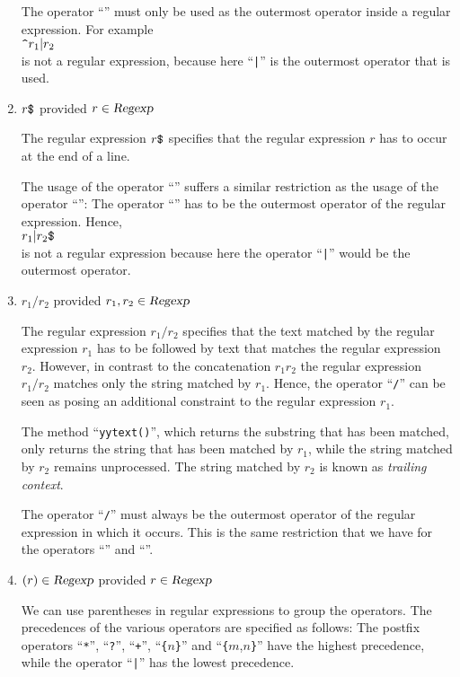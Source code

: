\begin{enumerate}
      The operator ``\texttt{}'' must only be used as the outermost operator inside a regular
      expression.  For example
      \\[0.2cm]
      \hspace*{1.3cm}
      $\texttt{\symbol{94}}r_1|r_2$
      \\[0.2cm]
      is not a regular expression, because here ``\texttt{|}'' is the outermost operator that is used.
\item $r\texttt{\symbol{36}}$ \quad provided $r \in \textsl{Regexp}$

      The regular expression $r\texttt{\symbol{36}}$ specifies that the regular expression $r$ has
      to occur at the end of a line.

      The usage of the operator  ``\texttt{}'' suffers a similar restriction as the usage
      of the operator ``\texttt{}'':  The operator ``\texttt{}'' has to be the
      outermost operator of the regular expression.  Hence,
      \\[0.2cm]
      \hspace*{1.3cm}
      $r_1|r_2\texttt{\symbol{36}}$
      \\[0.2cm]
      is not a regular expression because here the operator ``\texttt{|}'' would be the outermost
      operator.
\item $r_1\texttt{/}r_2$ \quad provided $r_1, r_2 \in \textsl{Regexp}$
  
      The regular expression $r_1\texttt{/}r_2$ specifies that the text matched by the regular
      expression  $r_1$ has to be followed by text that matches the regular expression $r_2$.
      However, in contrast to the concatenation $r_1r_2$ the regular expression $r_1/r_2$ matches
      only the string matched by $r_1$.
      Hence, the  operator ``\texttt{/}'' can be seen as posing an additional constraint to the
      regular expression $r_1$.

      The method ``\texttt{yytext()}'', which returns the substring that has been matched, only
      returns the string that has been matched by $r_1$, while the string matched by  $r_2$ remains
      unprocessed. The string matched by $r_2$ is known as \emph{trailing context}.

      The operator ``\texttt{/}'' must always be the outermost operator of the regular expression in
      which it occurs.  This is the same restriction that we have for the operators
      ``\texttt{}'' and ``\texttt{}''.
\item $(r) \in \textsl{Regexp}$ \quad provided $r \in \textsl{Regexp}$

      We can use parentheses in regular expressions to group the operators.
      The precedences of the various operators are specified as follows:
      The  postfix operators ``\texttt{*}'', ``\texttt{?}'', ``\texttt{+}'',
      ``\texttt{\{}$n$\texttt{\}}'' and ``\texttt{\{}$m$,$n$\texttt{\}}'' have the highest
      precedence, while the operator ``\texttt{|}'' has the lowest precedence.
\end{enumerate}
